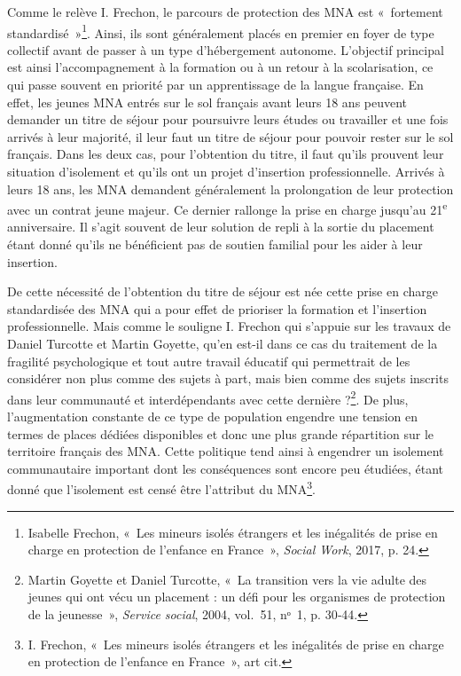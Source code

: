 \documentclass[
  12,
  a4paper,
]{report}
\begin{document}
Comme le relève I. Frechon, le parcours de protection des MNA est
«~fortement standardisé~»\footnote{Isabelle Frechon, {«~Les mineurs
  isolés étrangers et les inégalités de prise en charge en protection de
  l'enfance en France~»}, \emph{Social Work}, 2017, p. 24.}. Ainsi, ils
sont généralement placés en premier en foyer de type collectif avant de
passer à un type d'hébergement autonome. L'objectif principal est ainsi
l'accompagnement à la formation ou à un retour à la scolarisation, ce
qui passe souvent en priorité par un apprentissage de la langue
française. En effet, les jeunes MNA entrés sur le sol français avant
leurs 18 ans peuvent demander un titre de séjour pour poursuivre leurs
études ou travailler et une fois arrivés à leur majorité, il leur faut
un titre de séjour pour pouvoir rester sur le sol français. Dans les
deux cas, pour l'obtention du titre, il faut qu'ils prouvent leur
situation d'isolement et qu'ils ont un projet d'insertion
professionnelle. Arrivés à leurs 18 ans, les MNA demandent généralement
la prolongation de leur protection avec un contrat jeune majeur. Ce
dernier rallonge la prise en charge jusqu'au 21\textsuperscript{e}
anniversaire. Il s'agit souvent de leur solution de repli à la sortie du
placement étant donné qu'ils ne bénéficient pas de soutien familial pour
les aider à leur insertion.

De cette nécessité de l'obtention du titre de séjour est née cette prise
en charge standardisée des MNA qui a pour effet de prioriser la
formation et l'insertion professionnelle. Mais comme le souligne I.
Frechon qui s'appuie sur les travaux de Daniel Turcotte et Martin
Goyette, qu'en est-il dans ce cas du traitement de la fragilité
psychologique et tout autre travail éducatif qui permettrait de les
considérer non plus comme des sujets à part, mais bien comme des sujets
inscrits dans leur communauté et interdépendants avec cette dernière
?\footnote{Martin Goyette et Daniel Turcotte, {«~La transition vers la
  vie adulte des jeunes qui ont vécu un placement : un défi pour les
  organismes de protection de la jeunesse~»}, \emph{Service social},
  2004, vol.~51, nᵒ~1, p. 30‑44.}. De plus, l'augmentation constante de
ce type de population engendre une tension en termes de places dédiées
disponibles et donc une plus grande répartition sur le territoire
français des MNA. Cette politique tend ainsi à engendrer un isolement
communautaire important dont les conséquences sont encore peu étudiées,
étant donné que l'isolement est censé être l'attribut du MNA\footnote{I.
  Frechon, {«~Les mineurs isolés étrangers et les inégalités de prise en
  charge en protection de l'enfance en France~»}, art cit.}.
\end{document}
